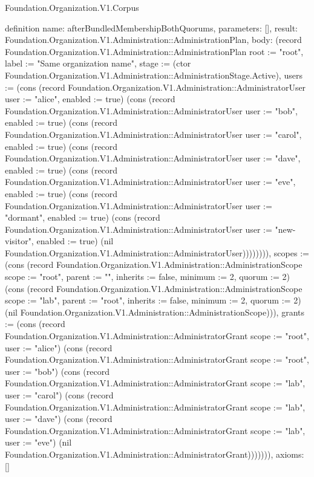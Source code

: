 \begin{lexlean}{Foundation.Organization.V1.Corpus}
\begin{semanticmodule}
definition{
  name: afterBundledMembershipBothQuorums,
  parameters: [],
  result: Foundation.Organization.V1.Administration::AdministrationPlan,
  body: (record Foundation.Organization.V1.Administration::AdministrationPlan {root := "root", label := "Same organization name", stage := (ctor Foundation.Organization.V1.Administration::AdministrationStage.Active), users := (cons (record Foundation.Organization.V1.Administration::AdministratorUser {user := "alice", enabled := true}) (cons (record Foundation.Organization.V1.Administration::AdministratorUser {user := "bob", enabled := true}) (cons (record Foundation.Organization.V1.Administration::AdministratorUser {user := "carol", enabled := true}) (cons (record Foundation.Organization.V1.Administration::AdministratorUser {user := "dave", enabled := true}) (cons (record Foundation.Organization.V1.Administration::AdministratorUser {user := "eve", enabled := true}) (cons (record Foundation.Organization.V1.Administration::AdministratorUser {user := "dormant", enabled := true}) (cons (record Foundation.Organization.V1.Administration::AdministratorUser {user := "new-visitor", enabled := true}) (nil Foundation.Organization.V1.Administration::AdministratorUser)))))))), scopes := (cons (record Foundation.Organization.V1.Administration::AdministrationScope {scope := "root", parent := "", inherits := false, minimum := 2, quorum := 2}) (cons (record Foundation.Organization.V1.Administration::AdministrationScope {scope := "lab", parent := "root", inherits := false, minimum := 2, quorum := 2}) (nil Foundation.Organization.V1.Administration::AdministrationScope))), grants := (cons (record Foundation.Organization.V1.Administration::AdministratorGrant {scope := "root", user := "alice"}) (cons (record Foundation.Organization.V1.Administration::AdministratorGrant {scope := "root", user := "bob"}) (cons (record Foundation.Organization.V1.Administration::AdministratorGrant {scope := "lab", user := "carol"}) (cons (record Foundation.Organization.V1.Administration::AdministratorGrant {scope := "lab", user := "dave"}) (cons (record Foundation.Organization.V1.Administration::AdministratorGrant {scope := "lab", user := "eve"}) (nil Foundation.Organization.V1.Administration::AdministratorGrant))))))}),
  axioms: []
}


\end{semanticmodule}
\end{lexlean}
